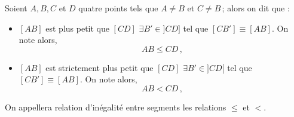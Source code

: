 
\begin{defi}\label{def-ineqlong}
    Soient $A,B,C$ et $D$ quatre points tels que $A\neq B$ et $C\neq B$\,; alors on dit que : 
    \begin{itemize}[$\bullet$]
        \item $[AB]$ est plus petit que $[CD]$ \ssi $\exists B'\in ]CD]$ tel que $[CB']\equiv [AB]$. On note alors,
    \begin{equation*}
        AB \leq CD\,,
    \end{equation*}
    \item $[AB]$ est strictement plus petit que $[CD]$ \ssi $\exists B'\in ]CD[$ tel que $[CB']\equiv [AB]$. On note alors,
    \begin{equation*}
        AB < CD\,,
    \end{equation*}
    \end{itemize} 
    On appellera relation d'inégalité entre segments les relations $\leq$ et $<$. 
\end{defi}




